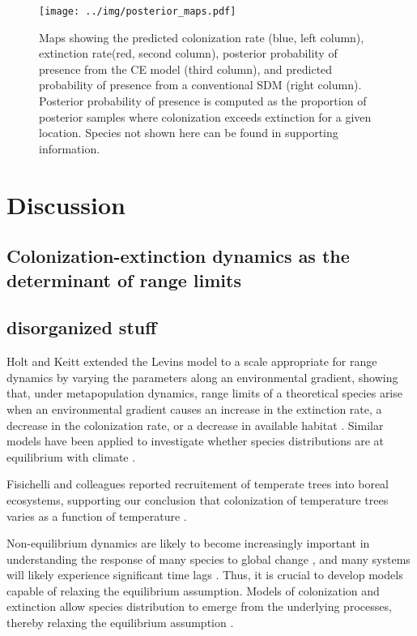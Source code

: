 \documentclass[11pt]{article}
\begin{document}
\begin{figure}
	\texttt{[image: ../img/posterior\_maps.pdf]}
	\caption{
		Maps showing the predicted colonization rate (blue, left column), extinction rate(red, second column), posterior probability of presence from the CE model (third column), and predicted probability of presence from a conventional SDM (right column).
		Posterior probability of presence is computed as the proportion of posterior samples where colonization exceeds extinction for a given location.
		Species not shown here can be found in supporting information.
	}
	\label{fig:response_curves}
\end{figure}


\section*{Discussion}

\subsection*{Colonization-extinction dynamics as the determinant of range limits}


\subsection*{disorganized stuff}
Holt and Keitt extended the Levins model to a scale appropriate for range dynamics by varying the parameters along an environmental gradient, showing that, under metapopulation dynamics, range limits of a theoretical species arise when an environmental gradient causes an increase in the extinction rate, a decrease in the colonization rate, or a decrease in available habitat \cite{Holt2000}.
Similar models have been applied to investigate whether species distributions are at equilibrium with climate \cite{Garcia2013}.


Fisichelli and colleagues reported recruitement of temperate trees into boreal ecosystems, supporting our conclusion that colonization of temperature trees varies as a function of temperature \cite{Fisichelli2014}.

Non-equilibrium dynamics are likely to become increasingly important in understanding the response of many species to global change \cite{Araujo2005, Svenning2013}, and many systems will likely experience significant time lags \cite{Garcia2013, Wu2015}. 
Thus, it is crucial to develop models capable of relaxing the equilibrium assumption. 
Models of colonization and extinction allow species distribution to emerge from the underlying processes, thereby relaxing the equilibrium assumption \cite{Holt2000, Yackulic2015}.
\end{document}
